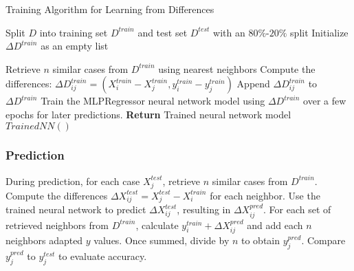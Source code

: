 \documentclass[a4paper, 12pt]{report}
\begin{document}
\begin{algorithm}
    \caption{Training Algorithm for Learning from Differences}
    \label{alg:learning_from_differences_train}
    \begin{algorithmic}[1]
        \State Split $D$ into training set $D^{train}$ and test set $D^{test}$ with an $80\%$-$20\%$ split
        \State Initialize $\Delta D^{train}$ as an empty list
        
            \State Retrieve $n$ similar cases from $D^{train}$ using nearest neighbors
                \State Compute the differences: $\Delta D^{train}_{ij} = (X^{train}_i - X^{train}_j, y^{train}_i - y^{train}_j)$
                \State Append $\Delta D^{train}_{ij}$ to $\Delta D^{train}$
            \EndFor
        \EndFor
        \State Train the MLPRegressor neural network model using $\Delta D^{train}$ over a few epochs for later predictions.
        \State \textbf{Return} Trained neural network model $Trained NN()$
    \end{algorithmic}
\end{algorithm}

\subsubsection{Prediction}
During prediction, for each case $X^{test}_j$, retrieve $n$ similar cases from $D^{train}$. Compute the differences $\Delta X^{test}_{ij} = X^{test}_j - X^{train}_i$ for each neighbor. 
Use the trained neural network to predict $\Delta X^{test}_{ij}$, resulting in $\Delta X^{pred}_{ij}$. 
For each set of retrieved neighbors from $D^{train}$, calculate $y^{train}_i + \Delta X^{pred}_{ij}$ and add each $n$ neighbors adapted $y$ values. 
Once summed, divide by $n$ to obtain $y^{pred}_j$. Compare $y^{pred}_j$ to $y^{test}_j$ to evaluate accuracy.
\end{document}
